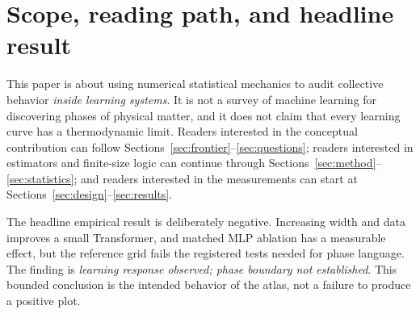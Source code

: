 \section*{Scope, reading path, and headline result}

This paper is about using numerical statistical mechanics to audit collective
behavior \emph{inside learning systems}. It is not a survey of machine learning
for discovering phases of physical matter, and it does not claim that every
learning curve has a thermodynamic limit. Readers interested in the conceptual
contribution can follow Sections~\ref{sec:frontier}--\ref{sec:questions}; readers
interested in estimators and finite-size logic can continue through
Sections~\ref{sec:method}--\ref{sec:statistics}; and readers interested in the
measurements can start at Sections~\ref{sec:design}--\ref{sec:results}.

The headline empirical result is deliberately negative. Increasing width and
data improves a small Transformer, and matched MLP ablation has a measurable
effect, but the reference grid fails the registered tests needed for phase
language. The finding is \emph{learning response observed; phase boundary not
established}. This bounded conclusion is the intended behavior of the atlas,
not a failure to produce a positive plot.


\FloatBarrier
